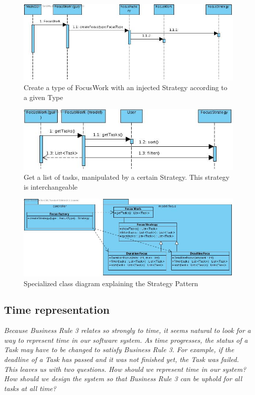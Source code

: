 		\begin{figure}[H]
			\begin{center}
				\includegraphics[scale=0.5]{images/FocusFactory.jpg}
			\end{center}
			\caption{Create a type of FocusWork with an injected Strategy according to a given Type}
		\end{figure}
		\begin{figure}[H]
			\begin{center}
				\includegraphics[scale=0.5]{images/FocusStrategy.jpg}
			\end{center}
			\caption{Get a list of tasks, manipulated by a certain Strategy. This strategy is interchangeable}
		\end{figure}
		\begin{figure}[H]
			\begin{center}
				\includegraphics[scale=0.5]{images/focus_class_diagram.jpg}
			\end{center}
			\caption{Specialized class diagram explaining the Strategy Pattern}
		\end{figure}
		\subsection{Time representation}
		\emph{
		Because Business Rule 3 relates so strongly to time, it seems natural to look for a way to represent time in our software system. As time progresses, the status of a Task may have to be changed to satisfy Business Rule 3. For example, if the deadline of a Task has passed and it was not finished yet, the Task was failed. This leaves us with two questions. How should we represent time in our system? How should we design the system so that Business Rule 3 can be uphold for all tasks at all time?}
		
